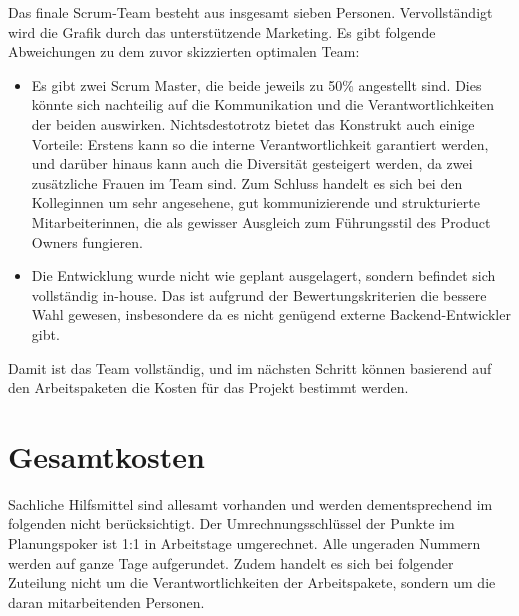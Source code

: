 Das finale Scrum-Team besteht aus insgesamt sieben Personen. Vervollständigt wird die Grafik durch das unterstützende Marketing. Es gibt folgende Abweichungen zu dem zuvor skizzierten optimalen Team:
\begin{itemize}
\item Es gibt zwei Scrum Master, die beide jeweils zu 50\% angestellt sind. Dies könnte sich nachteilig auf die Kommunikation und die Verantwortlichkeiten der beiden auswirken. Nichtsdestotrotz bietet das Konstrukt auch einige Vorteile: Erstens kann so die interne Verantwortlichkeit garantiert werden, und darüber hinaus kann auch die Diversität gesteigert werden, da zwei zusätzliche Frauen im Team sind. Zum Schluss handelt es sich bei den Kolleginnen um sehr angesehene, gut kommunizierende und strukturierte Mitarbeiterinnen, die als gewisser Ausgleich zum Führungsstil des Product Owners fungieren.
\item Die Entwicklung wurde nicht wie geplant ausgelagert, sondern befindet sich vollständig in-house. Das ist aufgrund der Bewertungskriterien die bessere Wahl gewesen, insbesondere da es nicht genügend externe Backend-Entwickler gibt.
\end{itemize}

Damit ist das Team vollständig, und im nächsten Schritt können basierend auf den Arbeitspaketen die Kosten für das Projekt bestimmt werden.

\section{Gesamtkosten}

Sachliche Hilfsmittel sind allesamt vorhanden und werden dementsprechend im folgenden nicht berücksichtigt. Der Umrechnungsschlüssel der Punkte im Planungspoker ist 1:1 in Arbeitstage umgerechnet. Alle ungeraden Nummern werden auf ganze Tage aufgerundet. Zudem handelt es sich bei folgender Zuteilung nicht um die Verantwortlichkeiten der Arbeitspakete, sondern um die daran mitarbeitenden Personen.

